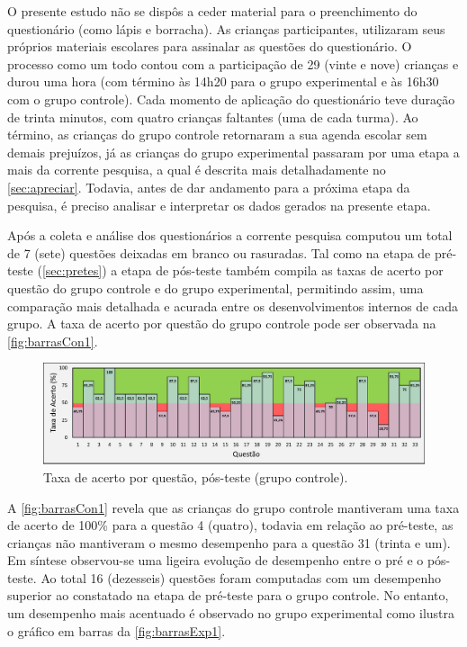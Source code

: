 O presente estudo não se dispôs a ceder material para o preenchimento do questionário (como lápis e borracha). As crianças participantes, utilizaram seus próprios materiais escolares para assinalar as questões do questionário. O processo como um todo contou com a participação de 29 (vinte e nove) crianças e durou uma hora (com término às 14h20 para o grupo experimental e às 16h30 com o grupo controle). Cada momento de aplicação do questionário teve duração de trinta minutos, com quatro crianças faltantes (uma de cada turma). Ao término, as crianças do grupo controle retornaram a sua agenda escolar sem demais prejuízos, já as crianças do grupo experimental passaram por uma etapa a mais da corrente pesquisa, a qual é descrita mais detalhadamente no \autoref{sec:apreciar}. Todavia, antes de dar andamento para a próxima etapa da pesquisa, é preciso analisar e interpretar os dados gerados na presente etapa. 

Após a coleta e análise dos questionários a corrente pesquisa computou um total de 7 (sete) questões deixadas em branco ou rasuradas. Tal como na etapa de pré-teste (\autoref{sec:pretes}) a etapa de pós-teste também compila as taxas de acerto por questão do grupo controle e do grupo experimental, permitindo assim, uma comparação mais detalhada e acurada entre os desenvolvimentos internos de cada grupo. A taxa de acerto por questão do grupo controle pode ser observada na \autoref{fig:barrasCon1}.

\pagebreak

\begin{figure}[htb]

    \caption{\label{fig:barrasCon1}Taxa de acerto por questão, pós-teste (grupo controle).}
    \includegraphics[width=\linewidth]{./Visuais/NotasControlePOS.pdf}
  
\end{figure}

A \autoref{fig:barrasCon1} revela que as crianças do grupo controle mantiveram uma taxa de acerto de 100\% para a questão 4 (quatro), todavia em relação ao pré-teste, as crianças não mantiveram o mesmo desempenho para a questão 31 (trinta e um). Em síntese observou-se uma ligeira evolução de desempenho entre o pré e o pós-teste. Ao total 16 (dezesseis) questões foram computadas com um desempenho superior ao constatado na etapa de pré-teste para o grupo controle. 
No entanto, um desempenho mais acentuado é observado no grupo experimental como ilustra o gráfico em barras da \autoref{fig:barrasExp1}.


